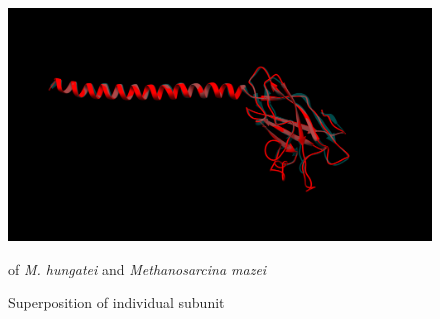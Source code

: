 \documentclass[fontsize=12pt,headsepline=true, bibliography=totocnumbered, twoside]{scrbook} %
\begin{document}
\begin{figure}[]
\center
\includegraphics[width=1\linewidth]{superposition}
\caption{Superposition of individual subunit}
of \textit{M. hungatei} and \textit{Methanosarcina mazei}
\label{superposition}
\end{figure}
\end{document}
